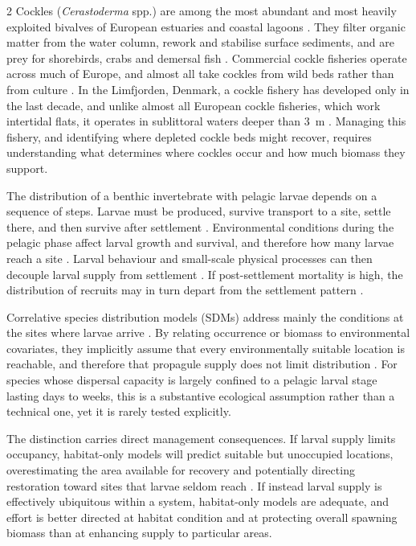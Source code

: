 \begin{spacing}{2}
Cockles (\textit{Cerastoderma} spp.) are among the most abundant and most heavily exploited bivalves of European estuaries and coastal lagoons
\citep{malhamReviewBiologyEuropean2012}. They filter organic matter from the water column, rework and stabilise surface sediments, and are prey for shorebirds, crabs and demersal fish \citep{carssEcosystemServicesProvided2020}. Commercial cockle fisheries operate across much of Europe, and almost all take cockles from wild beds
rather than from culture \citep{carssEcosystemServicesProvided2020}. In the
Limfjorden, Denmark, a cockle fishery has developed only in the last decade, and unlike almost all European cockle fisheries, which work intertidal flats, it operates in sublittoral waters deeper than 3~m \citep{Freitas2024}. Managing this fishery, and identifying where depleted cockle beds might recover, requires understanding what determines where cockles occur and how much biomass they support.

The distribution of a benthic invertebrate with pelagic larvae depends on a sequence of steps. Larvae must be produced, survive transport to a site, settle there, and then survive after settlement \citep{pinedaComplexitySimplificationUnderstanding2009}.
Environmental conditions during the pelagic phase affect larval growth and survival, and therefore how many larvae reach a site \citep{cowenLarvalDispersalMarine2009}. Larval behaviour and small-scale physical processes can then decouple larval supply from settlement \citep{pinedaCausesDecouplingLarval2010}. If post-settlement mortality is high, the distribution of recruits may in turn depart from the settlement pattern \citep{gosselinJuvenileMortalityBenthic1997,
huntRoleEarlyPostsettlement1997}. 

Correlative species distribution models (SDMs) address mainly the conditions at the sites where larvae arrive \citep{robinsonPushingLimitsMarine2011}. By relating occurrence or biomass to environmental covariates, they implicitly assume that every environmentally suitable location is reachable, and therefore that propagule supply does not limit distribution \citep{barveCrucialRoleAccessible2011}. For species whose dispersal capacity is largely confined to a pelagic larval stage lasting days to weeks, this is a substantive ecological assumption rather than a technical one, yet it is rarely tested explicitly.

The distinction carries direct management consequences. If larval supply limits occupancy, habitat-only models will predict suitable but unoccupied locations, overestimating the area available for recovery and potentially directing restoration toward sites that larvae seldom reach
\citep{griecoDesigningDispersalConnectivityinformed2026}. If instead larval supply is effectively ubiquitous within a system, habitat-only models are adequate, and effort is better directed at habitat condition and at protecting overall spawning biomass than at enhancing supply to particular areas.


\end{spacing}
